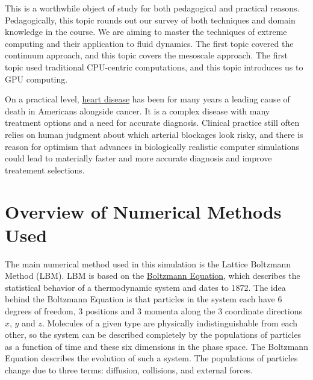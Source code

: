 \documentclass[11pt]{article} %
\begin{document}
This is a worthwhile object of study for both pedagogical and practical reasons.
Pedagogically, this topic rounds out our survey of both techniques and domain knowledge in the course.
We are aiming to master the techniques of extreme computing and their application to fluid dynamics.
The first topic covered the continuum approach, and this topic covers the mesoscale approach.
The first topic used traditional CPU-centric computations, and this topic introduces us to GPU computing.

On a practical level, \href{https://www.cdc.gov/heartdisease/facts.htm}{heart disease} 
has been for many years a leading cause of death in Americans alongside cancer.
It is a complex disease with many treatment options and a need for accurate diagnosis.
Clinical practice still often relies on human judgment about which arterial blockages 
look risky, and there is reason for optimism that advances in biologically realistic computer
simulations could lead to materially faster and more accurate diagnosis 
and improve treatement selections.

\newpage
\section{Overview of Numerical Methods Used}
The main numerical method used in this simulation is the Lattice Boltzmann Method (LBM).
LBM is based on the \href{https://en.wikipedia.org/wiki/Boltzmann_equation}{Boltzmann Equation},
which describes the statistical behavior of a thermodynamic system and dates to 1872.
The idea behind the Boltzmann Equation is that particles in the system each have 6 degrees
of freedom, 3 positions and 3 momenta along the 3 coordinate directions $x$, $y$ and $z$.
Molecules of a given type are physically indistinguishable from each other,
so the system can be described completely by the populations of particles as a function
of time and these six dimensions in the phase space.
The Boltzmann Equation describes the evolution of such a system.
The populations of particles change due to three terms: 
diffusion, collisions, and external forces.
\end{document}
